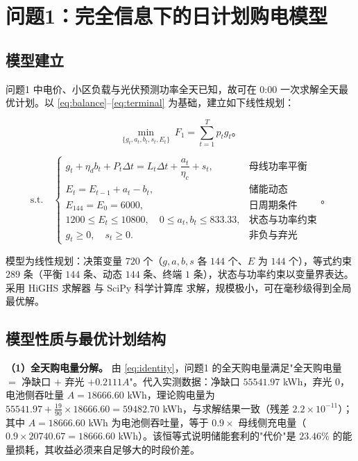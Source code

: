\section{问题1：完全信息下的日计划购电模型}

\subsection{模型建立}

问题1 中电价、小区负载与光伏预测功率全天已知，故可在 0:00 一次求解全天最优计划。以 \cref{eq:balance}--\cref{eq:terminal} 为基础，建立如下线性规划：

\begin{equation}
  \min_{\{g_t,a_t,b_t,s_t,E_t\}}\ F_1=\sum_{t=1}^{T}p_tg_t\text{。}
  \label{eq:p1-obj}
\end{equation}

\begin{equation}
  \text{s.t.}\quad
  \begin{cases}
    g_t+\eta_db_t+P_t\Delta t=L_t\Delta t+\dfrac{a_t}{\eta_c}+s_t, & \text{母线功率平衡}\\[4pt]
    E_t=E_{t-1}+a_t-b_t, & \text{储能动态}\\[4pt]
    E_{144}=E_0=6000, & \text{日周期条件}\\[4pt]
    1200\le E_t\le10800,\quad 0\le a_t,b_t\le 833.33, & \text{状态与功率约束}\\[4pt]
    g_t\ge0,\quad s_t\ge0 . & \text{非负与弃光}
  \end{cases}\text{。}
  \label{eq:p1-cons}
\end{equation}

模型为线性规划：决策变量 $720$ 个（$g,a,b,s$ 各 $144$ 个、$E$ 为 $144$ 个），等式约束 $289$ 条（平衡 $144$ 条、动态 $144$ 条、终端 $1$ 条），状态与功率约束以变量界表达。采用 HiGHS 求解器\cite{huangfu2018highs} 与 SciPy 科学计算库\cite{virtanen2020} 求解，规模极小，可在毫秒级得到全局最优解。

\subsection{模型性质与最优计划结构}

\textbf{（1）全天购电量分解。} 由 \cref{eq:identity}，问题1 的全天购电量满足"全天购电量 $=$ 净缺口 $+$ 弃光 $+0.2111A$"。代入实测数据：净缺口 $55541.97$ \si{kWh}，弃光 $0$，电池侧吞吐量 $A=18666.60$ \si{kWh}，理论购电量为 $55541.97+\frac{19}{90}\times18666.60=59482.70$ \si{kWh}，与求解结果一致（残差 $2.2\times10^{-11}$）；其中 $A=18666.60$ \si{kWh} 为电池侧吞吐量，等于 $0.9\times$ 母线侧充电量（$0.9\times20740.67=18666.60$ \si{kWh}）。该恒等式说明储能套利的"代价"是 $23.46\%$ 的能量损耗，其收益必须来自足够大的时段价差。


